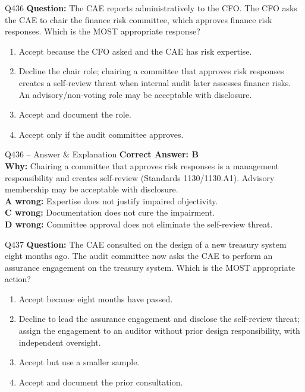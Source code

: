 \documentclass[aspectratio=169,10pt]{beamer}
\begin{document}
	\begin{frame}[t]{Q436}
		\small
		\textbf{Question:} The CAE reports administratively to the CFO. The CFO asks the CAE to chair the finance risk committee, which approves finance risk responses. Which is the MOST appropriate response?
		\begin{enumerate}[label=\Alph*.,itemsep=1pt,topsep=2pt]
			\item Accept because the CFO asked and the CAE has risk expertise.
			\item Decline the chair role; chairing a committee that approves risk responses creates a self-review threat when internal audit later assesses finance risks. An advisory/non-voting role may be acceptable with disclosure.
			\item Accept and document the role.
			\item Accept only if the audit committee approves.
		\end{enumerate}
	\end{frame}
	
	\begin{frame}[t]{Q436 -- Answer \& Explanation}
		\small
		\textbf{Correct Answer: B} \\[4pt]
		\textbf{Why:} Chairing a committee that approves risk responses is a management responsibility and creates self-review (Standards 1130/1130.A1). Advisory membership may be acceptable with disclosure. \\[4pt]
		\textbf{A wrong:} Expertise does not justify impaired objectivity. \\[2pt]
		\textbf{C wrong:} Documentation does not cure the impairment. \\[2pt]
		\textbf{D wrong:} Committee approval does not eliminate the self-review threat.
	\end{frame}
	
	\begin{frame}[t]{Q437}
		\small
		\textbf{Question:} The CAE consulted on the design of a new treasury system eight months ago. The audit committee now asks the CAE to perform an assurance engagement on the treasury system. Which is the MOST appropriate action?
		\begin{enumerate}[label=\Alph*.,itemsep=1pt,topsep=2pt]
			\item Accept because eight months have passed.
			\item Decline to lead the assurance engagement and disclose the self-review threat; assign the engagement to an auditor without prior design responsibility, with independent oversight.
			\item Accept but use a smaller sample.
			\item Accept and document the prior consultation.
		\end{enumerate}
	\end{frame}
	
\end{document}
